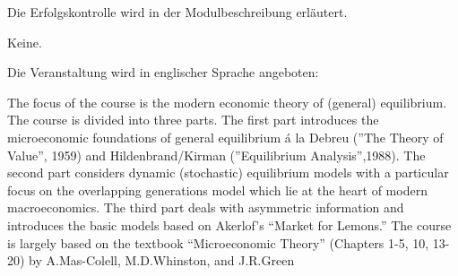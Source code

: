 \begin{course}

\setdoclanguagegerman
{}



\coursehead


\label{cour_7079.dp_997}


\begin{styleenv}
\begin{assessment}
Die Erfolgskontrolle wird in der Modulbeschreibung erläutert.


\end{assessment}

\begin{conditions}Keine.\end{conditions}


\end{styleenv}

\begin{learningoutcomes}

\end{learningoutcomes}

\begin{content}
Die Veranstaltung wird in englischer Sprache angeboten:

 

The focus of the course is the modern economic theory of (general) equilibrium. The course is divided into three parts. The first part introduces the microeconomic foundations of general equilibrium á la Debreu (”The Theory of Value”, 1959) and Hildenbrand/Kirman (”Equilibrium Analysis”,1988). The second part considers dynamic (stochastic) equilibrium models with a particular focus on the overlapping generations model which lie at the heart of modern macroeconomics. The third part deals with asymmetric information and introduces the basic models based on Akerlof's “Market for Lemons.” The course is largely based on the textbook “Microeconomic Theory” (Chapters 1-5, 10, 13-20) by A.Mas-Colell, M.D.Whinston, and J.R.Green



\end{content}
\end{course}
